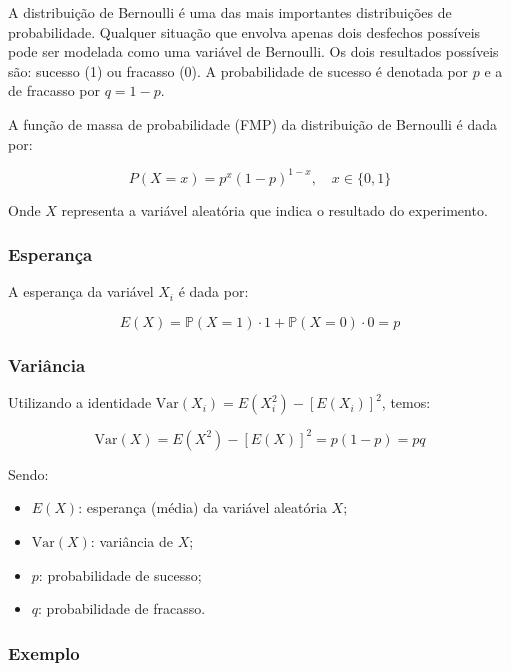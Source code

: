 \documentclass[
]{article}
\begin{document}
A distribuição de Bernoulli é uma das mais importantes distribuições de probabilidade. Qualquer situação que envolva apenas dois desfechos possíveis pode ser modelada como uma variável de Bernoulli. Os dois resultados possíveis são: sucesso (1) ou fracasso (0). A probabilidade de sucesso é denotada por \(p\) e a de fracasso por \(q = 1 - p\).

A função de massa de probabilidade (FMP) da distribuição de Bernoulli é dada por:

\[
P(X = x) = p^x (1 - p)^{1 - x}, \quad x \in \{0, 1\}
\]

Onde \(X\) representa a variável aleatória que indica o resultado do experimento.

\hypertarget{esperanuxe7a}{%
\subsubsection{Esperança}\label{esperanuxe7a}}

A esperança da variável \(X_i\) é dada por:

\[
E(X) = \mathbb{P}(X = 1) \cdot 1 + \mathbb{P}(X = 0) \cdot 0 = p
\]

\hypertarget{variuxe2ncia}{%
\subsubsection{Variância}\label{variuxe2ncia}}

Utilizando a identidade \(\text{Var}(X_i) = E(X_i^2) - [E(X_i)]^2\), temos:

\[
\text{Var}(X) = E(X^2) - [E(X)]^2 = p(1 - p) = pq
\]

Sendo:

\begin{itemize}
  \item $E(X)$: esperança (média) da variável aleatória $X$;
  \item $\text{Var}(X)$: variância de $X$;
  \item $p$: probabilidade de sucesso;
  \item $q$: probabilidade de fracasso.
\end{itemize}

\hypertarget{exemplo-bernoulli}{%
\subsubsection{Exemplo}\label{exemplo-bernoulli}}
\end{document}

